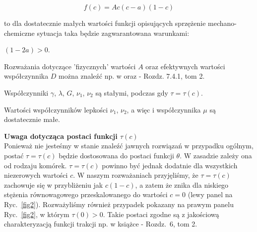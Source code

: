 \[ f(c)=A c(c-a)(1-c) \] 

\noindent to dla dostatecznie małych wartości funkcji opisujących sprzężenie mechano-chemiczne sytuacja taka będzie zagwarantowana warunkami: 

\begin{assum} \label{a0} 
	$(1-2 a) > 0$.
\end{assum}

\medskip 

\noindent Rozważania dotyczące 'fizycznych' wartości $A$ oraz efektywnych wartości współczynnika $D$ można znaleźć np. w \cite{Kazmierczak2011} oraz \cite{Keener2009} - Rozdz. 7.4.1, tom 2.  


\begin{assum} \label{a01} 
	Współczynniki $\gamma$, $\lambda$, $G$, $\nu_1$, $\nu_2$ 
	są stałymi, podczas gdy $\tau=\tau(c)$.
\end{assum}

\medskip 

\begin{assum} \label{a02} 
	Wartości współczynników lepkości $\nu_1$, $\nu_2$, a więc i współczynnika $\mu$ są dostatecznie małe.
\end{assum} 

\noindent \textbf{Uwaga dotycząca postaci funkcji $\tau(c)$} \\ \noindent Ponieważ nie jesteśmy w stanie znaleźć jawnych rozwiązań w przypadku ogólnym, postać ${\tau=\tau(c)}$ będzie dostosowana do postaci funkcji $\theta$. W zasadzie zależy ona od rodzaju komórek. $\tau=\tau(c)$ powinno być jednak dodatnie dla wszystkich niezerowych wartości $c$. W naszym rozważaniach przyjęliśmy, że $\tau=\tau(c)$ zachowuje się w przybliżeniu jak $c(1-c)$, a zatem że znika dla niskiego stężenia równowagowego przeskalowanego do wartości $c=0$ (lewy panel na Ryc.~\ref{fig2}). Rozważyliśmy również przypadek pokazany na prawym panelu Ryc.~\ref{fig2}, w którym $\tau(0)>0$. Takie postaci zgodne są z jakościową charakteryzacją funkcji trakcji np. w książce \cite{Murray2007} - Rozdz.~6, tom 2. 

\medskip

